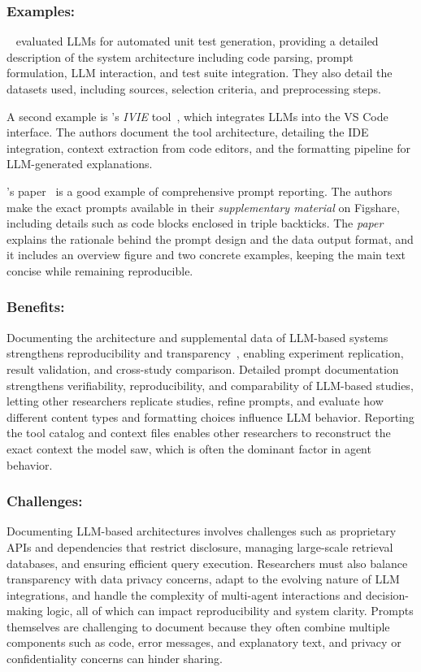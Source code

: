\documentclass[smallextended]{svjour3}
\newcommand{\paper}{\emph{paper}\xspace}
\newcommand{\supplementarymaterial}{\emph{supplementary material}\xspace}
\newcommand{\paper}{\emph{paper}\xspace}
\newcommand{\supplementarymaterial}{\emph{supplementary material}\xspace}
\newcommand{\guidelinesubsubsection}[1]{\subsubsection{\bfseries #1:}}
\newcommand{\guidelinesubsubsection}[1]{\subsubsection{#1}}
\begin{document}
\guidelinesubsubsection{Examples}

\citeauthor{DBLP:journals/tse/SchaferNET24}~\cite{DBLP:journals/tse/SchaferNET24} evaluated LLMs for automated unit test generation, providing a detailed description of the system architecture including code parsing, prompt formulation, LLM interaction, and test suite integration.
They also detail the datasets used, including sources, selection criteria, and preprocessing steps.

A second example is \citeauthor{DBLP:conf/chi/YanHWH24}'s \emph{IVIE} tool~\cite{DBLP:conf/chi/YanHWH24}, which integrates LLMs into the VS Code interface.
The authors document the tool architecture, detailing the IDE integration, context extraction from code editors, and the formatting pipeline for LLM-generated explanations.

\citeauthor{DBLP:journals/pacmse/LiangBBDFF024}'s paper~\cite{DBLP:journals/pacmse/LiangBBDFF024} is a good example of comprehensive prompt reporting.
The authors make the exact prompts available in their \supplementarymaterial on Figshare, including details such as code blocks enclosed in triple backticks.
The \paper explains the rationale behind the prompt design and the data output format, and it includes an overview figure and two concrete examples, keeping the main text concise while remaining reproducible.

\guidelinesubsubsection{Benefits}

Documenting the architecture and supplemental data of LLM-based systems strengthens reproducibility and transparency~\cite{DBLP:journals/software/LuZXXW24}, enabling experiment replication, result validation, and cross-study comparison.
Detailed prompt documentation strengthens verifiability, reproducibility, and comparability of LLM-based studies, letting other researchers replicate studies, refine prompts, and evaluate how different content types and formatting choices influence LLM behavior.
Reporting the tool catalog and context files enables other researchers to reconstruct the exact context the model saw, which is often the dominant factor in agent behavior.

\guidelinesubsubsection{Challenges}

Documenting LLM-based architectures involves challenges such as proprietary APIs and dependencies that restrict disclosure, managing large-scale retrieval databases, and ensuring efficient query execution.
Researchers must also balance transparency with data privacy concerns, adapt to the evolving nature of LLM integrations, and handle the complexity of multi-agent interactions and decision-making logic, all of which can impact reproducibility and system clarity.
Prompts themselves are challenging to document because they often combine multiple components such as code, error messages, and explanatory text, and privacy or confidentiality concerns can hinder sharing.
\end{document}

